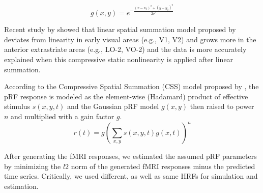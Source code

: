 \documentclass[portrait,final,a0paper,fontscale=0.277]{baposter}
\begin{document}
\begin{poster}
{  \begin{equation}
  g(x, y) = e^{-\frac{(x-x_0)^2+(y-y_0)^2}{2\sigma^2}}
  \end{equation}
  
  Recent study by \cite{Kay2013} showed that linear spatial summation model proposed by \cite{Dumoulin2008} deviates from linearity in early visual areas (e.g., V1, V2) and grows more in the anterior extrastriate areas (e.g., LO-2, VO-2) and the data is more accurately explained when this compressive static nonlinearity is applied after linear summation.
  
  According to the Compressive Spatial Summation (CSS) model proposed by \cite{Kay2013}, the pRF response is modeled as the element-wise (Hadamard) product of effective stimulus $s(x, y, t)$ and the Gaussian pRF model $g(x, y)$ then raised to power $n$ and multiplied with a gain factor $g$.
  \begin{equation}
  r(t) = g (\sum_{x, y} s(x, y, t) g(x, t))^n
  \end{equation}
  
  
  After generating the fMRI responses, we estimated the assumed pRF parameters by minimizing the $l2$ norm of the generated fMRI responses minus the predicted time series. Critically, we used different, as well as same HRFs for simulation and estimation.
  
   \vspace{0.3em}
  }

\end{poster}
\end{document}
